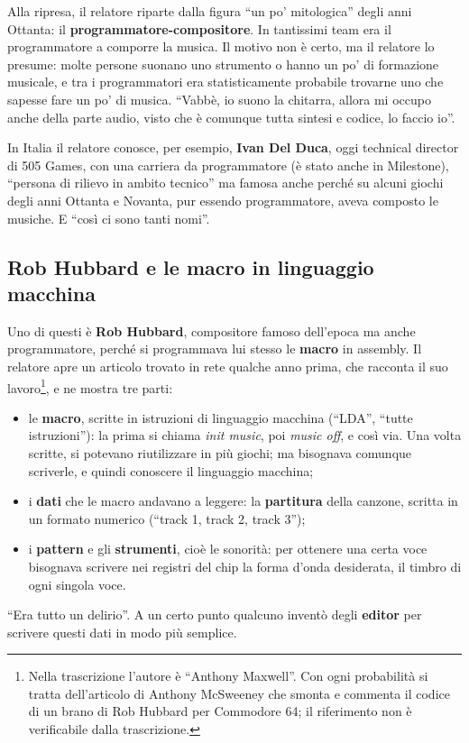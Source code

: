Alla ripresa, il relatore riparte dalla figura ``un po' mitologica'' degli anni
Ottanta: il \textbf{programmatore-compositore}. In tantissimi team era il
programmatore a comporre la musica. Il motivo non è certo, ma il relatore lo
presume: molte persone suonano uno strumento o hanno un po' di formazione
musicale, e tra i programmatori era statisticamente probabile trovarne uno che
sapesse fare un po' di musica. ``Vabbè, io suono la chitarra, allora mi occupo
anche della parte audio, visto che è comunque tutta sintesi e codice, lo faccio
io''.

In Italia il relatore conosce, per esempio, \textbf{Ivan Del Duca}, oggi
technical director di 505 Games, con una carriera da programmatore (è stato
anche in Milestone), ``persona di rilievo in ambito tecnico'' ma famosa anche
perché su alcuni giochi degli anni Ottanta e Novanta, pur essendo
programmatore, aveva composto le musiche. E ``così ci sono tanti nomi''.

\subsection{Rob Hubbard e le macro in linguaggio macchina}

Uno di questi è \textbf{Rob Hubbard}, compositore famoso dell'epoca ma anche
programmatore, perché si programmava lui stesso le \textbf{macro} in assembly. Il
relatore apre un articolo trovato in rete qualche anno prima, che racconta il
suo lavoro\footnote{Nella trascrizione l'autore è ``Anthony Maxwell''. Con ogni
probabilità si tratta dell'articolo di Anthony McSweeney che smonta e commenta
il codice di un brano di Rob Hubbard per Commodore 64; il riferimento non è
verificabile dalla trascrizione.}, e ne mostra tre parti:
\begin{itemize}
  \item le \textbf{macro}, scritte in istruzioni di linguaggio macchina (``LDA'',
        ``tutte istruzioni''): la prima si chiama \emph{init music}, poi
        \emph{music off}, e così via. Una volta scritte, si potevano riutilizzare
        in più giochi; ma bisognava comunque scriverle, e quindi conoscere il
        linguaggio macchina;
  \item i \textbf{dati} che le macro andavano a leggere: la \textbf{partitura}
        della canzone, scritta in un formato numerico (``track 1, track 2, track
        3'');
  \item i \textbf{pattern} e gli \textbf{strumenti}, cioè le sonorità: per
        ottenere una certa voce bisognava scrivere nei registri del chip la forma
        d'onda desiderata, il timbro di ogni singola voce.
\end{itemize}
``Era tutto un delirio''. A un certo punto qualcuno inventò degli
\textbf{editor} per scrivere questi dati in modo più semplice.

